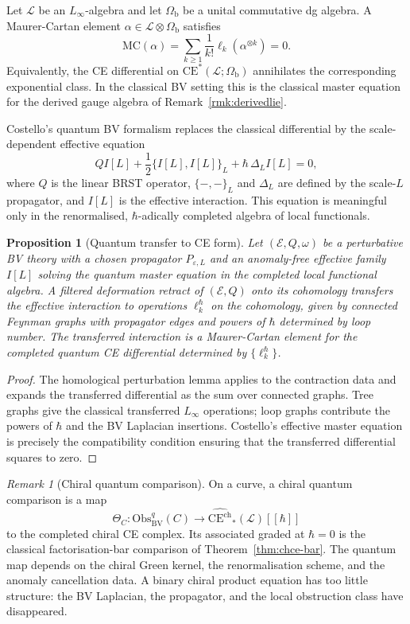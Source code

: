 \documentclass[11pt]{amsart}
\providecommand{\BV}{\mathrm{BV}}
\providecommand{\CE}{\mathrm{CE}}
\providecommand{\chCE}{\mathrm{CE}^{\mathrm{ch}}}
\providecommand{\cE}{\mathcal{E}}
\providecommand{\cL}{\mathcal{L}}
\providecommand{\Obs}{\mathrm{Obs}}
\providecommand{\Omb}{\Omega_{\mathrm{b}}}
\providecommand{\MC}{\mathrm{MC}}
\theoremstyle{plain}
\newtheorem{proposition}[theorem]{Proposition}
\theoremstyle{definition}
\theoremstyle{remark}
\newtheorem{remark}[theorem]{Remark}
\begin{document}
Let $\cL$ be an $L_\infty$-algebra and let $\Omb$ be a unital
commutative dg algebra.  A Maurer-Cartan element
$\alpha\in\cL\otimes\Omb$ satisfies
\[
  \MC(\alpha)
  =
  \sum_{k\geq 1}\frac{1}{k!}
  \ell_k(\alpha^{\otimes k})
  =
  0.
\]
Equivalently, the CE differential on $\CE^*(\cL;\Omb)$ annihilates the
corresponding exponential class.  In the classical BV setting this is
the classical master equation for the derived gauge algebra of
Remark~\ref{rmk:derivedlie}.

Costello's quantum BV formalism replaces the classical differential by
the scale-dependent effective equation
\[
  QI[L]
  +\frac{1}{2}\{I[L],I[L]\}_L
  +\hbar\,\Delta_L I[L]
  =
  0,
\]
where $Q$ is the linear BRST operator, $\{-,-\}_L$ and $\Delta_L$ are
defined by the scale-$L$ propagator, and $I[L]$ is the effective
interaction.  This equation is meaningful only in the renormalised,
$\hbar$-adically completed algebra of local functionals.

\begin{proposition}[Quantum transfer to CE form]
\label{prop:qme-hce}
Let $(\cE,Q,\omega)$ be a perturbative BV theory with a chosen
propagator $P_{\varepsilon,L}$ and an anomaly-free effective family
$I[L]$ solving the quantum master equation in the completed local
functional algebra.  A filtered deformation retract of $(\cE,Q)$ onto
its cohomology transfers the effective interaction to operations
$\ell^\hbar_k$ on the cohomology, given by connected Feynman graphs
with propagator edges and powers of $\hbar$ determined by loop number.
The transferred interaction is a Maurer-Cartan element for the
completed quantum CE differential determined by $\{\ell^\hbar_k\}$.
\end{proposition}

\begin{proof}
The homological perturbation lemma applies to the contraction data and
expands the transferred differential as the sum over connected graphs.
Tree graphs give the classical transferred $L_\infty$ operations; loop
graphs contribute the powers of $\hbar$ and the BV Laplacian insertions.
Costello's effective master equation is precisely the compatibility
condition ensuring that the transferred differential squares to zero.
\end{proof}

\begin{remark}[Chiral quantum comparison]
\label{rmk:chiral-qme}
On a curve, a chiral quantum comparison is a map
\[
  \Theta_C:
  \Obs^q_{\BV}(C)
  \longrightarrow
  \widehat{\chCE}_*(\cL)[[\hbar]]
\]
to the completed chiral CE complex.  Its associated graded at
$\hbar=0$ is the classical factorisation-bar comparison of
Theorem~\ref{thm:chce-bar}.  The quantum map depends on the chiral
Green kernel, the renormalisation scheme, and the anomaly cancellation
data.  A binary chiral product equation has too little structure:
the BV Laplacian, the propagator, and the local obstruction class have
disappeared.
\end{remark}
\end{document}
